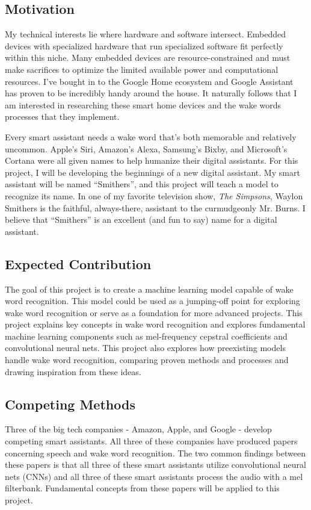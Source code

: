 \documentclass[conference]{IEEEtran}
\begin{document}
\subsection{Motivation}

My technical interests lie where hardware and software intersect.
Embedded devices with specialized hardware that run specialized software
fit perfectly within this niche.
Many embedded devices are resource-constrained and must make sacrifices
to optimize the limited available power and computational resources.
I've bought in to the Google Home ecosystem and Google Assistant 
has proven to be incredibly handy around the house.
It naturally follows that I am interested in researching these smart home devices
and the wake words processes that they implement.

Every smart assistant needs a wake word that's both memorable and relatively uncommon.
Apple's Siri, Amazon's Alexa, Samsung's Bixby, and Microsoft's Cortana
were all given names to help humanize their digital assistants.
For this project, I will be developing the beginnings of a new digital assistant.
My smart assistant will be named ``Smithers'',
and this project will teach a model to recognize its name.
In one of my favorite television show, \textit{The Simpsons}, 
Waylon Smithers is the faithful, always-there, assistant to the curmudgeonly Mr. Burns. 
I believe that ``Smithers'' is an excellent (and fun to say) name for a digital assistant.

\subsection{Expected Contribution}
The goal of this project is to create a machine learning model capable of wake word recognition.
This model could be used as a jumping-off point for exploring wake word recognition
or serve as a foundation for more advanced projects.
This project explains key concepts in wake word recognition
and explores fundamental machine learning components 
such as mel-frequency cepstral coefficients and convolutional neural nets.
This project also explores how preexisting models handle wake word recognition,
comparing proven methods and processes and drawing inspiration from these ideas.

\subsection{Competing Methods}
Three of the big tech companies - Amazon, Apple, and Google - 
develop competing smart assistants.
All three of these companies have produced papers concerning speech and wake word recognition.
The two common findings between these papers is that
all three of these smart assistants utilize convolutional neural nets (CNNs)
and all three of these smart assistants process the audio with a mel filterbank.
Fundamental concepts from these papers will be applied to this project.
\end{document}
